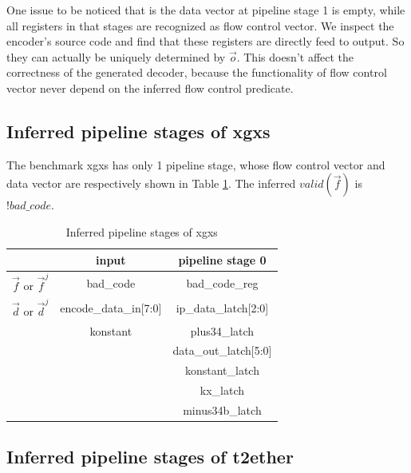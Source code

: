 \documentclass[conference]{IEEEtran}
\begin{document}
One issue to be noticed that is the data vector at pipeline stage 1 is empty,
while all registers in that stages are recognized as flow control vector.
We inspect the encoder's source code and find that these registers are 
directly feed to output.
So they can actually be uniquely determined by $\vec{o}$.
This doesn't affect the correctness of the generated decoder,
because the functionality of flow control vector never depend on the inferred flow control predicate.


\subsection{Inferred pipeline stages of xgxs}


The benchmark xgxs has only 1 pipeline stage,
whose flow control vector and data vector are respectively shown in Table \ref{tab_xgxs}.
The inferred $valid(\vec{f})$ is $!bad\_code$.

\begin{table}[b]
\centering
\caption{Inferred pipeline stages of xgxs}
\begin{tabular}{|c|c|c|}
\hline
                       & input                  &  pipeline stage 0    \\\hline\hline
$\vec{f}$ or $\vec{f}^j$&bad\_code              & bad\_code\_reg\\\hline
$\vec{d}$ or $\vec{d}^j$&encode\_data\_in[7:0]  &ip\_data\_latch[2:0] \\
                       &konstant                &plus34\_latch     \\
                       &                        &data\_out\_latch[5:0]\\
                       &                        &konstant\_latch   \\
                       &                        &kx\_latch         \\
                       &                        &minus34b\_latch   \\\hline
\end{tabular}\label{tab_xgxs} 
\end{table}


\subsection{Inferred pipeline stages of t2ether}
\end{document}
